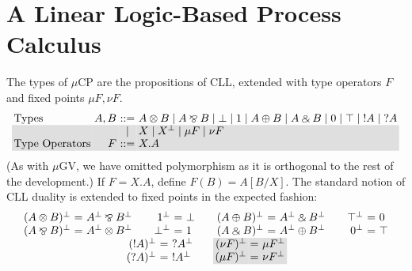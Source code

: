 \documentclass[orivec,envcountsame]{llncs}
\makeatletter
\newcommand{\with}{\mathbin\binampersand}
\newcommand{\parr}{\mathbin\bindnasrepma}
\newcommand{\cpdual}[1]{#1^\perp}
\newcommand{\cpbang}[1]{{! #1}}
\newcommand{\cpquery}[1]{{? #1}}
\newcommand{\mucp}{$\mu\mathrm{CP}$\xspace}
\newcommand{\mugv}{$\mu\mathrm{GV}$\xspace}
\newcommand{\ba}{\begin{array}}
\newcommand{\ea}{\end{array}}
\newenvironment{eqs}{\ba{@{}r@{~}c@{~}l@{}}}{\ea}
\newcommand\shaderow{\noalign{\vskip-0.4pt}\rowcolor{shade}[0.6mm]}
\makeatother
\begin{document}
\section{A Linear Logic-Based Process Calculus}\label{sec:mucp}


The types of \mucp are the propositions of CLL, extended with type operators $F$ and fixed points
$\mu F,\nu F$.
\small\[\begin{array}{@{}l@{~}r@{~}c@{~}l@{}}
  \text{Types} & A,B & ::= & A \otimes B \mid A \parr B \mid \bot \mid 1 \mid A \oplus B \mid A \with B \mid 0 \mid \top
       \mid   \cpbang{A} \mid \cpquery{A} \\ \shaderow
   & & \mid & {X} \mid {\cpdual{X}}
       \mid   {\mu F} \mid {\nu F} \\ \shaderow
   \text{Type Operators} & F & ::= & X.A \\
\end{array}\]\normalsize
(As with \mugv, we have omitted polymorphism as it is orthogonal to the rest of the development.)
If $F = X.A$, define $F(B) = A[B/X]$.  The standard notion of CLL duality is extended to fixed
points in the expected fashion:
\[
\ba{c}
\ba{@{}c@{\qquad}c@{\qquad}c@{\qquad}c@{}}
\begin{eqs}
  \cpdual{(A \otimes B)} &=& \cpdual{A} \parr \cpdual{B} \\
  \cpdual{(A \parr B)} &=& \cpdual{A} \otimes \cpdual{B} \\
\end{eqs}
&
\begin{eqs}
  \cpdual{1} &=& \bot \\
  \cpdual{\bot} &=& 1 \\
\end{eqs}
&
\begin{eqs}
  \cpdual{(A \oplus B)} &=& \cpdual{A} \with \cpdual{B} \\
  \cpdual{(A \with B)} &=& \cpdual{A} \oplus \cpdual{B} \\
\end{eqs}
&
\begin{eqs}
  \cpdual{\top} &=& 0 \\
  \cpdual{0} &=& \top \\
\end{eqs}
\ea
\\
\ba{@{}c@{\qquad}c@{}}
\begin{eqs}
  \cpdual{(\cpbang{A})} &=& \cpquery{\cpdual{A}} \\
  \cpdual{(\cpquery{A})} &=& \cpbang{\cpdual{A}} \\
\end{eqs}
&
\begin{eqs}
  \shaderow \cpdual{(\nu F)} &=& \mu \cpdual{F} \\
  \shaderow \cpdual{(\mu F)} &=& \nu \cpdual{F} \\
\end{eqs} \\
\ea
\ea
\]
\end{document}

